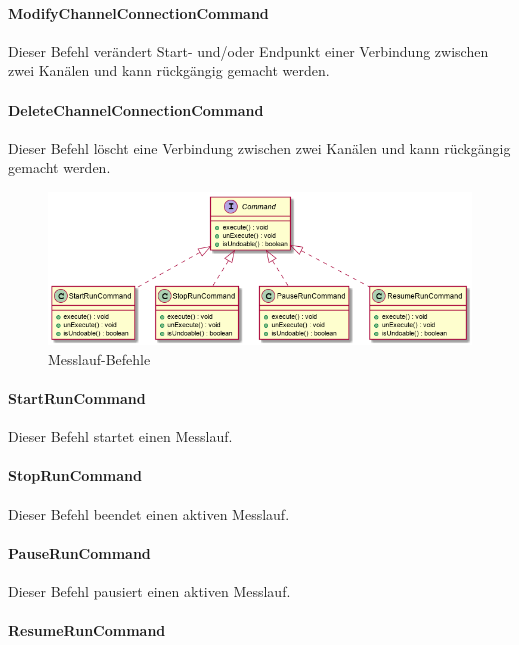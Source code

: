 \documentclass[parskip=full]{scrartcl}
\begin{document}
\paragraph{ModifyChannelConnectionCommand}

Dieser Befehl verändert Start- und/oder Endpunkt einer Verbindung zwischen zwei Kanälen und kann rückgängig gemacht werden.

\paragraph{DeleteChannelConnectionCommand}

Dieser Befehl löscht eine Verbindung zwischen zwei Kanälen und kann rückgängig gemacht werden.

\begin{figure}[htbp]
	\begin{center}
		\includegraphics[width = 12cm]{Grafiken/Commands3.png}
		\caption{Messlauf-Befehle}
		\label{Commands3}
	\end{center}
\end{figure}

\paragraph{StartRunCommand}

Dieser Befehl startet einen Messlauf.

\paragraph{StopRunCommand}

Dieser Befehl beendet einen aktiven Messlauf.

\paragraph{PauseRunCommand}

Dieser Befehl pausiert einen aktiven Messlauf.

\paragraph{ResumeRunCommand}
\end{document}
